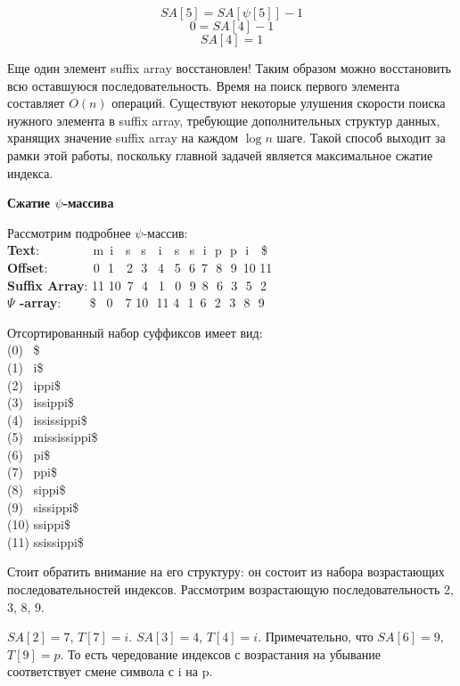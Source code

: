 \[SA[5] = SA[\psi[5]] - 1\]
\[0 = SA[4] - 1\]
\[SA[4] = 1\]

Еще один элемент suffix array восстановлен! Таким образом можно восстановить всю оставшуюся последовательность.
Время на поиск первого элемента составляет \(O(n)\) операций.
Существуют некоторые улушения скорости поиска нужного элемента в suffix array, требующие дополнительных
структур данных, хранящих значение suffix array на каждом \(\log n\) шаге. Такой способ выходит за рамки этой работы,
поскольку главной задачей является максимальное сжатие индекса.

\textbf{Сжатие $\psi$-массива}

Рассмотрим подробнее $\psi$-массив:
\\ \textbf{Text}:\,\,\,\,\,\,\,\,\,\,\,\,\,\,\,\,\,\,\,\,\,\,\,\, m \,i \,\,\,\,s \,\,\,s \,\,\,\,i \,\,\,\,s \,\,\,s \,\,i \,\,p \,\,p \,\,i \,\,\,\,\$
\\ \textbf{Offset}:\,\,\,\,\,\,\,\,\,\,\,\,\,\,\,\,\,\,\,\, 0 \,\,1 \,\,\,\,2 \,\,3 \,\,\,4 \,\,\,5 \,\,6 \,7 \,\,8 \,\,9 \,10 11
\\ \textbf{Suffix Array}:   11 10 \,7 \,\,4 \,\,\,1 \,\,\,0 \,\,9 \,8 \,\,6 \,\,3 \,\,5 \,\,2
\\ \textbf{$\Psi$ -array}: \,\,\,\,\,\,\,\,\,\,\,\,\$ \,\,\,0 \,\,\,\,7 10 \,\,11 4 \,\,1 \,6 \,\,2 \,\,3 \,\,8 \,\,9

Отсортированный набор суффиксов имеет вид:
\\ (0) \,\,\,\$
\\ (1) \,\,\,i\$
\\ (2) \,\,\,ippi\$
\\ (3) \,\,\,issippi\$
\\ (4) \,\,\,ississippi\$
\\ (5) \,\,\,mississippi\$
\\ (6) \,\,\,pi\$
\\ (7) \,\,\,ppi\$
\\ (8) \,\,\,sippi\$
\\ (9) \,\,\,sissippi\$
\\ (10) ssippi\$
\\ (11) ssissippi\$

Стоит обратить внимание на его структуру: он состоит из набора возрастающих последовательностей индексов.
Рассмотрим возрастающую последовательность 2, 3, 8, 9.

$SA[2] = 7$, $T[7] = i$.
$SA[3] = 4$, $T[4] = i$. Примечательно, что $SA[6] = 9$, $T[9] = p$.
То есть чередование индексов с возрастания на убывание соответствует смене символа с i на p.

